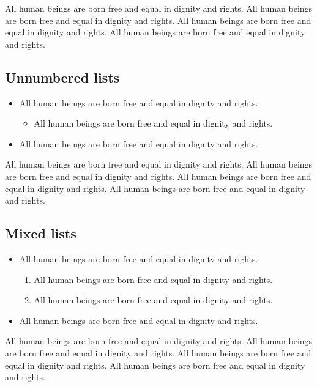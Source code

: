 \documentclass[
  ngerman,
  american,
  letterpaper,
  DIV=11,
  numbers=noendperiod]{scrartcl}
\providecommand{\tightlist}{%
  \setlength{\itemsep}{0pt}\setlength{\parskip}{0pt}}
\begin{document}
All human beings are born free and equal in dignity and rights. All
human beings are born free and equal in dignity and rights. All human
beings are born free and equal in dignity and rights. All human beings
are born free and equal in dignity and rights.

\subsection{Unnumbered lists}\label{unnumbered-lists}

\begin{itemize}
\tightlist
\item
  All human beings are born free and equal in dignity and rights.

  \begin{itemize}
  \tightlist
  \item
    All human beings are born free and equal in dignity and rights.
  \end{itemize}
\item
  All human beings are born free and equal in dignity and rights.
\end{itemize}

All human beings are born free and equal in dignity and rights. All
human beings are born free and equal in dignity and rights. All human
beings are born free and equal in dignity and rights. All human beings
are born free and equal in dignity and rights.

\subsection{Mixed lists}\label{mixed-lists}

\begin{itemize}
\tightlist
\item
  All human beings are born free and equal in dignity and rights.

  \begin{enumerate}
  \def\labelenumi{\arabic{enumi}.}
  \tightlist
  \item
    All human beings are born free and equal in dignity and rights.
  \item
    All human beings are born free and equal in dignity and rights.
  \end{enumerate}
\item
  All human beings are born free and equal in dignity and rights.
\end{itemize}

All human beings are born free and equal in dignity and rights. All
human beings are born free and equal in dignity and rights. All human
beings are born free and equal in dignity and rights. All human beings
are born free and equal in dignity and rights.
\end{document}
